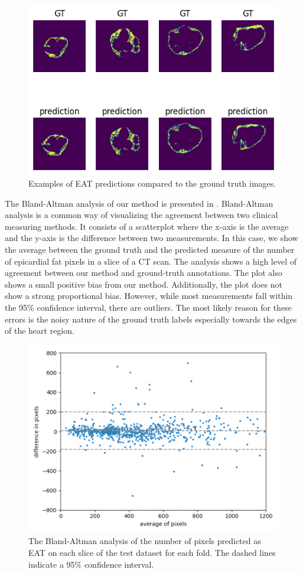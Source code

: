 \begin{figure}[b!]
    \centering
    \includegraphics[width=0.7\columnwidth]{images/6/examples.png}
    \caption{Examples of EAT predictions compared to the ground truth images. \cite{bencevicEpicardialAdiposeTissue2021}}
    \label{fig:examples}
\end{figure}

The Bland-Altman analysis of our method is presented in . Bland-Altman analysis is a common way of visualizing the agreement between two clinical measuring methods. It consists of a scatterplot where the x-axis is the average and the y-axis is the difference between two measurements. In this case, we show the average between the ground truth and the predicted measure of the number of epicardial fat pixels in a slice of a CT scan. The analysis shows a high level of agreement between our method and ground-truth annotations. The plot also shows a small positive bias from our method. Additionally, the plot does not show a strong proportional bias. However, while most measurements fall within the 95\% confidence interval, there are outliers. The most likely reason for these errors is the noisy nature of the ground truth labels especially towards the edges of the heart region.

\begin{figure}[t!]
    \centering
    \includegraphics[width=0.75\columnwidth]{images/6/blaltman.jpg}
    \caption{The Bland-Altman analysis of the number of pixels predicted as EAT on each slice of the test dataset for each fold. The dashed lines indicate a 95\% confidence interval. \cite{bencevicEpicardialAdiposeTissue2021}}
    \label{fig:corr}
\end{figure}


